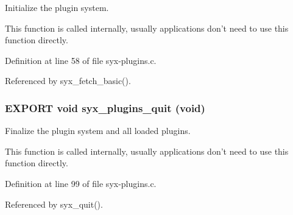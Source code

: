 Initialize the plugin system.

This function is called internally, usually applications don't need to use this function directly. 

Definition at line 58 of file syx-plugins.c.

Referenced by syx\_\-fetch\_\-basic().\hypertarget{syx-plugins_8h_ea277a3b110086b42fbc7ff3fe9fd535}{
\subsubsection{\setlength{\rightskip}{0pt plus 5cm}EXPORT void syx\_\-plugins\_\-quit (void)}}
\label{syx-plugins_8h_ea277a3b110086b42fbc7ff3fe9fd535}


Finalize the plugin system and all loaded plugins.

This function is called internally, usually applications don't need to use this function directly. 

Definition at line 99 of file syx-plugins.c.

Referenced by syx\_\-quit().